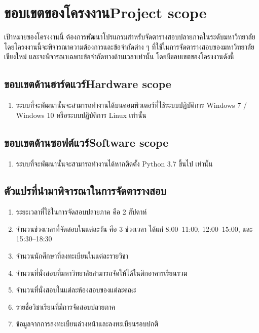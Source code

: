 \section{\ifcpe ขอบเขตของโครงงาน\else Project scope\fi}
เป้าหมายของโครงงานนี้ ต้องการพัฒนาโปรแกรมสำหรับจัดตารางสอบปลายภาคในระดับมหาวิทยาลัย
โดยโครงงานนี้จะพิจารณาความต้องการและข้อจำกัดต่าง ๆ ที่ใช้ในการจัดตารางสอบของมหาวิทยาลัยเชียงใหม่
และจะพิจารณาเฉพาะข้อจำกัดทางด้านเวลาเท่านั้น โดยมีขอบเขตของโครงงานดังนี้ 
\subsection{\ifcpe ขอบเขตด้านฮาร์ดแวร์\else Hardware scope\fi}
\begin{enumerate}
    \item ระบบที่จะพัฒนานั้นจะสามารถทำงานได้บนคอมพิวเตอร์ที่ใช้ระบบปฏิบัติการ Windows 7 / Windows 10 หรือระบบปฏิบัติการ Linux เท่านั้น
\end{enumerate}
\subsection{\ifcpe ขอบเขตด้านซอฟต์แวร์\else Software scope\fi}
\begin{enumerate}
    \item ระบบที่จะพัฒนานั้นจะสามารถทำงานได้หากติดตั้ง Python 3.7 ขึ้นไป เท่านั้น 
\end{enumerate}
\subsection{ตัวแปรที่นำมาพิจารณาในการจัดตารางสอบ}
\begin{enumerate}
    \item ระยะเวลาที่ใช้ในการจัดสอบปลายภาค คือ 2 สัปดาห์
    \item จำนวนช่วงเวลาที่จัดสอบในแต่ละวัน คือ 3 ช่วงเวลา ได้แก่ 8:00--11:00, 12:00--15:00, 
    และ 15:30--18:30
    \item จำนวนนักศึกษาที่ลงทะเบียนในแต่ละรายวิชา
    \item จำนวนที่นั่งสอบที่มหาวิทยาลัยสามารถจัดให้ได้ในตึกอาคารเรียนรวม
    \item จำนวนที่นั่งสอบในแต่ละห้องสอบของแต่ละคณะ
    \item รายชื่อวิชาเรียนที่มีการจัดสอบปลายภาค
    \item ข้อมูลจากการลงทะเบียนล่วงหน้าและลงทะเบียนรอบปกติ
\end{enumerate}

